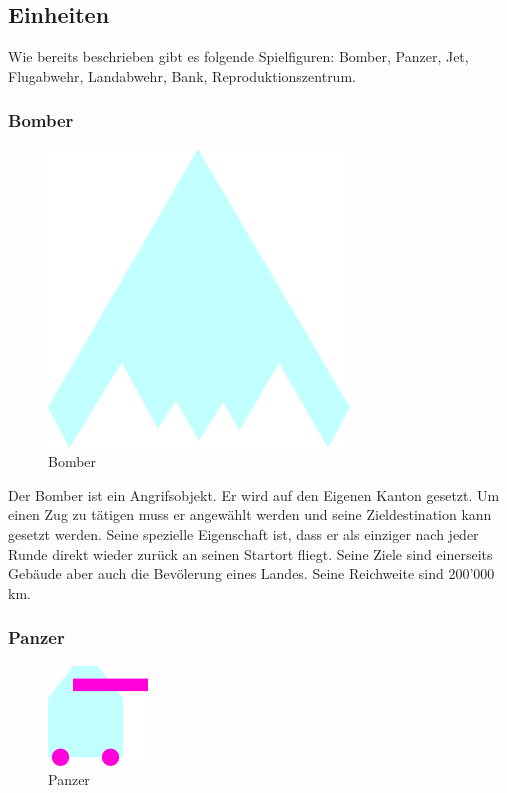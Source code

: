 \documentclass[ngerman, 12pt, pdftex]{scrartcl}[2006/07/30]
\begin{document}
\newpage

\subsection{Einheiten} \label{subsec:Einheit}

Wie bereits beschrieben gibt es folgende Spielfiguren: Bomber, Panzer, Jet, Flugabwehr, Landabwehr, Bank, Reproduktionszentrum.

\subsubsection{Bomber}

\begin{figure}[h]
\centering
\includegraphics[scale=1.8]{spiel/Bomber.png}
\caption{Bomber}
\end{figure}

Der Bomber ist ein Angrifsobjekt.
Er wird auf den Eigenen Kanton gesetzt. Um einen Zug zu tätigen muss er angewählt werden und seine Zieldestination kann gesetzt werden. Seine spezielle Eigenschaft ist, dass er als einziger nach jeder Runde direkt wieder zurück an seinen Startort fliegt.
Seine Ziele sind einerseits Gebäude aber auch die Bevölerung eines Landes. Seine Reichweite sind 200'000 km.

\subsubsection{Panzer}

\begin{figure}[h]
\centering
\includegraphics[scale=1.8]{spiel/Panzer.png}
\caption{Panzer}
\end{figure}
\end{document}
